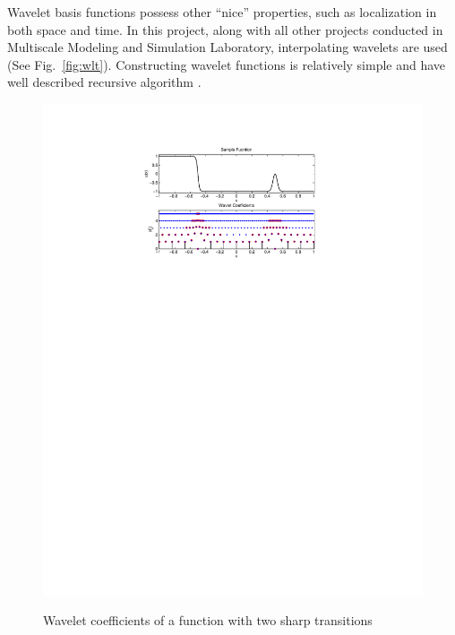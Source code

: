 Wavelet basis functions possess other ``nice'' properties, such as localization in both space and time. In this project, along with all other projects conducted in Multiscale Modeling and Simulation Laboratory, interpolating wavelets are used (See Fig.~\ref{fig:wlt}). Constructing wavelet functions is relatively simple and have well described recursive algorithm \cite{lib:wlt_home}.

\begin{figure}[t]
\centering \includegraphics[scale=1]{fig/wlt_decomp.pdf}\\
\caption{Wavelet coefficients of a function with two sharp transitions \label{fig:wlt_decomp}}
\end{figure}
